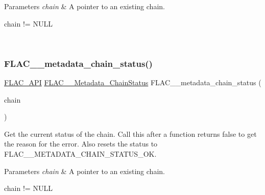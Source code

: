 \begin{DoxyParams}{Parameters}
{\em chain} & A pointer to an existing chain.  
\begin{DoxyCode}
chain != NULL 
\end{DoxyCode}
 \\
\hline
\end{DoxyParams}
\mbox{\label{group__flac__metadata__level2_ga3d030e216a6517f23372bb76f0639127}} 
\subsubsection{\texorpdfstring{F\+L\+A\+C\+\_\+\+\_\+metadata\+\_\+chain\+\_\+status()}{FLAC\_\_metadata\_chain\_status()}}
{\footnotesize\ttfamily \hyperlink{group__flac__export_ga56ca07df8a23310707732b1c0007d6f5}{F\+L\+A\+C\+\_\+\+A\+PI} \hyperlink{group__flac__metadata__level2_gafe2a924893b0800b020bea8160fd4531}{F\+L\+A\+C\+\_\+\+\_\+\+Metadata\+\_\+\+Chain\+Status} F\+L\+A\+C\+\_\+\+\_\+metadata\+\_\+chain\+\_\+status (\begin{DoxyParamCaption}\item[{\hyperlink{group__flac__metadata__level2_gaec6993c60b88f222a52af86f8f47bfdf}{F\+L\+A\+C\+\_\+\+\_\+\+Metadata\+\_\+\+Chain} $\ast$}]{chain }\end{DoxyParamCaption})}

Get the current status of the chain. Call this after a function returns {\ttfamily false} to get the reason for the error. Also resets the status to F\+L\+A\+C\+\_\+\+\_\+\+M\+E\+T\+A\+D\+A\+T\+A\+\_\+\+C\+H\+A\+I\+N\+\_\+\+S\+T\+A\+T\+U\+S\+\_\+\+OK.


\begin{DoxyParams}{Parameters}
{\em chain} & A pointer to an existing chain.  
\begin{DoxyCode}
chain != NULL 
\end{DoxyCode}
 \\
\hline
\end{DoxyParams}

